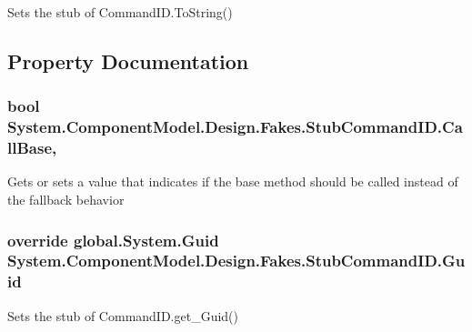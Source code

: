 Sets the stub of Command\-I\-D.\-To\-String()



\subsection{Property Documentation}
\hypertarget{class_system_1_1_component_model_1_1_design_1_1_fakes_1_1_stub_command_i_d_a951232f5ca677b64f9df5f17f602cd51}{
\subsubsection[{Call\-Base}]{\setlength{\rightskip}{0pt plus 5cm}bool System.\-Component\-Model.\-Design.\-Fakes.\-Stub\-Command\-I\-D.\-Call\-Base\hspace{0.3cm}{\ttfamily [get]}, {\ttfamily [set]}}}\label{class_system_1_1_component_model_1_1_design_1_1_fakes_1_1_stub_command_i_d_a951232f5ca677b64f9df5f17f602cd51}


Gets or sets a value that indicates if the base method should be called instead of the fallback behavior

\hypertarget{class_system_1_1_component_model_1_1_design_1_1_fakes_1_1_stub_command_i_d_ac058b619634ebdbe780d6f8f12caaf99}{
\subsubsection[{Guid}]{\setlength{\rightskip}{0pt plus 5cm}override global.\-System.\-Guid System.\-Component\-Model.\-Design.\-Fakes.\-Stub\-Command\-I\-D.\-Guid\hspace{0.3cm}{\ttfamily [get]}}}\label{class_system_1_1_component_model_1_1_design_1_1_fakes_1_1_stub_command_i_d_ac058b619634ebdbe780d6f8f12caaf99}


Sets the stub of Command\-I\-D.\-get\-\_\-\-Guid()

